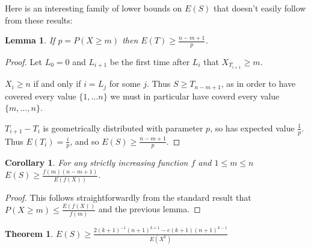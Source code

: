 \documentclass[a4paper]{article}
\newtheorem{lemma}{Lemma}
\newtheorem{corollary}{Corollary}
\newtheorem{theorem}{Theorem}
\begin{document}
Here is an interesting family of lower bounds on \(E(S)\) that doesn't easily follow from these results:

\begin{lemma}
If \(p = P(X \geq m)\) then \(E(T) \geq \frac{n - m + 1}{p}\).
\end{lemma}

\begin{proof}
Let \(L_0 = 0\) and \(L_{i + 1}\) be the first time after \(L_i\) that \(X_{T_{i + 1}} \geq m\).

\(X_i \geq n\) if and only if \(i = L_j\) for some \(j\).
Thus \(S \geq T_{n - m + 1}\),
as in order to have covered every value \(\{1, \ldots n\}\) we must in particular have coverd every value \(\{m, \ldots, n\}\).

\(T_{i + 1} - T_i\) is geometrically distributed with parameter \(p\), so has expected value \(\frac{1}{p}\).
Thus \(E(T_i) = \frac{i}{p}\),
and so \(E(S) \geq \frac{n - m + 1}{p}\).
\end{proof}

\begin{corollary}
For any strictly increasing function \(f\) and \(1 \leq m \leq n\)
\(E(S) \geq \frac{f(m) (n - m + 1)}{E(f(X))}\).
\end{corollary}

\begin{proof}
This follows straightforwardly from the standard result that \(P(X \geq m) \leq \frac{E(f(X))}{f(m)}\) and the previous lemma.
\end{proof}

\begin{theorem}
\(E(S) \geq \frac{2 {(k + 1)}^{-1} {(n + 1)}^{k + 1} - e (k + 1) {(n + 1)}^{k - 1}}{E(X^k)}\)
\end{theorem}
\end{document}
